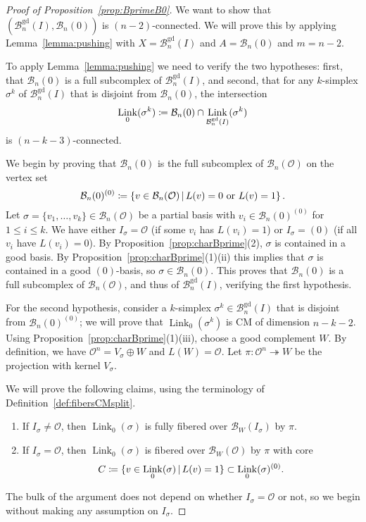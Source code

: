 \documentclass[11 pt]{article}
\theoremstyle{plain}
\theoremstyle{definition}
\numberwithin{equation}{section}
\renewcommand{\O}{\mathcal{O}}
\newcommand\PartialBases{\ensuremath{\mathcal{B}}}
\newcommand{\PB}{\PartialBases}
\newcommand{\PartialBasesGood}{\PartialBases^{\text{gd}}}
\newcommand{\PBg}{\PartialBasesGood}
\DeclareMathOperator{\Link}{Link}
\newcommand\onto{\twoheadrightarrow}
\newcommand\coloneq{\mathrel{\mathop:}\mkern-1.2mu=}
\begin{document}
\begin{proof}[Proof of Proposition~\ref{prop:BprimeB0}]
We want to show that $(\PBg_n(I),\PB_n(0))$ is $(n-2)$-connected. We will prove this by applying Lemma~\ref{lemma:pushing} with $X = \PartialBasesGood_n(I)$ and $A = \PartialBases_n(0)$ and $m=n-2$. 

 To apply Lemma~\ref{lemma:pushing} we need to verify the two hypotheses: 
first, that $\PartialBases_n(0)$ is a full subcomplex of $\PartialBasesGood_n(I)$, and second, that for any $k$-simplex
$\sigma^k$ of $\PartialBasesGood_n(I)$ that is disjoint from $\PartialBases_n(0)$, the intersection
\[\Link_0(\sigma^k)\coloneq \PB_n(0)\cap \Link_{\PartialBasesGood_n(I)}(\sigma^k)\] is $(n-k-3)$-connected. 

We begin by proving that $\PB_n(0)$ is the full subcomplex of $\PB_n(\O)$ on the vertex set \[\PB_n(0)^{(0)}\coloneq \left\{v\in \PB_n(\O)\,|\,L(v)=0\text{ or }L(v) = 1\right\}.\]
Let $\sigma=\{v_1,\ldots,v_k\}\in \PB_n(\O)$ be a partial basis with $v_i\in \PB_n(0)^{(0)}$ for $1\leq i\leq k$. We have either $I_\sigma=\O$ (if some $v_i$ has $L(v_i)=1$) or $I_\sigma=(0)$ (if all $v_i$ have $L(v_i)=0$). By Proposition~\ref{prop:charBprime}(2), $\sigma$ is contained in a good basis. By Proposition~\ref{prop:charBprime}(1)(ii) this implies that $\sigma$ is contained in a good $(0)$-basis, so $\sigma\in \PB_n(0)$. This proves that $\PB_n(0)$ is a full subcomplex of $\PB_n(\O)$, and thus of $\PBg_n(I)$, verifying the first hypothesis. 

For the second hypothesis, consider a $k$-simplex $\sigma^k\in \PBg_n(I)$ that is disjoint from $\PB_n(0)^{(0)}$; we will prove that $\Link_0(\sigma^k)$ is CM of dimension $n-k-2$. Using Proposition~\ref{prop:charBprime}(1)(iii), choose a good complement $W$.  By definition, we have $\O^n=V_\sigma\oplus W$ and $L(W)=\O$. Let $\pi\colon \O^n\onto W$ be the projection with kernel $V_\sigma$. 

We will prove the following claims, using the terminology of Definition~\ref{def:fibersCMsplit}.
\begin{enumerate}[nosep]
\item If $I_\sigma\neq \O$, then $\Link_0(\sigma)$ is fully fibered over $\PB_W(I_\sigma)$ by $\pi$.
\item 
If $I_\sigma=\O$, then $\Link_0(\sigma)$ is fibered over $\PB_W(\O)$ by $\pi$ with core \[C\coloneq \{ v\in \Link_0(\sigma)\,|\, L(v)=1\}\subset \Link_0(\sigma)^{(0)}.\]
\end{enumerate}
The bulk of the argument does not depend on whether $I_\sigma=\O$ or not, so we begin without making any assumption on $I_\sigma$.


\end{proof}
\end{document}
